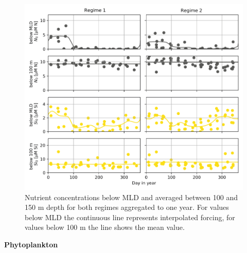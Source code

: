\begin{figure}
\centering
\includegraphics[trim = 0mm 0mm 0mm 0mm, clip, width=0.68\linewidth]{./Chp2-Pre/NutsBELOWmldAsset1011.png}
\caption[Scheme]{\small {Nutrient concentrations below MLD and averaged between 100 and 150 m depth for both regimes aggregated to one year. For values below MLD the continuous line represents interpolated forcing, for values below 100 m the line shows the mean value.}}
\label{BelowMLD}
\end{figure}



{\bf {Phytoplankton}}

